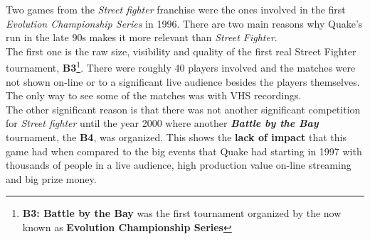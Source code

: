 Two games from the \textit{Street fighter} franchise were the ones involved in the first \textit{Evolution Championship Series} in 1996. There are two main reasons why Quake's run in the late 90s makes it more relevant than \textit{Street Fighter}.\\

The first one is the raw size, visibility and quality of the first real Street Fighter tournament, \textbf{B3}\footnote{\textbf{B3: Battle by the Bay}\citep{evo} was the first tournament organized by the now known as \textbf{Evolution Championship Series}}. There were roughly 40 players involved and the matches were not shown on-line or to a significant live audience besides the players themselves. The only way to see some of the matches was with VHS recordings.\\

The other significant reason is that there was not another significant competition for \textit{Street fighter} until the year 2000 where another \textit{\textbf{Battle by the Bay}} tournament, the \textbf{B4}, was organized. This shows the \textbf{lack of impact} that this game had when compared to the big events that Quake had starting in 1997 with thousands of people in a live audience, high production value on-line streaming and big prize money.
